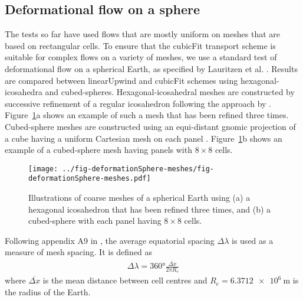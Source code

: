 \subsection{Deformational flow on a sphere}
\label{sec:deformationSphere}
The tests so far have used flows that are mostly uniform on meshes that are based on rectangular cells.
To ensure that the cubicFit transport scheme is suitable for complex flows on a variety of meshes, we use a standard test of deformational flow on a spherical Earth, as specified by Lauritzen et al. \citep{lauritzen2012}.  
Results are compared between linearUpwind and cubicFit schemes using hexagonal-icosahedra and cubed-spheres.
Hexagonal-icosahedral meshes are constructed by successive refinement of a regular icosahedron following the approach by \citep{thuburn2014}.
Figure~\ref{fig:sphere-meshes}a shows an example of such a mesh that has been refined three times.
Cubed-sphere meshes are constructed using an equi-distant gnomic projection of a cube having a uniform Cartesian mesh on each panel \citep{staniforth-thuburn2012}.
Figure~\ref{fig:sphere-meshes}b shows an example of a cubed-sphere mesh having panels with $8 \times 8$ cells.

\begin{figure}
	\centering
	\texttt{[image: ../fig-deformationSphere-meshes/fig-deformationSphere-meshes.pdf]}
	\caption{Illustrations of coarse meshes of a spherical Earth using (a) a hexagonal icosahedron that has been refined three times, and (b) a cubed-sphere with each panel having $8 \times 8$ cells.}
	\label{fig:sphere-meshes}
\end{figure}

Following appendix A9 in \citep{lauritzen2014}, the average equatorial spacing $\Delta \lambda$ is used as a measure of mesh spacing.  It is defined as
\begin{align}
	\Delta \lambda = \ang{360} \frac{\overline{\Delta x}}{2 \pi R_e}
\end{align}
where $\overline{\Delta x}$ is the mean distance between cell centres and $R_e = \SI{6.3712e6}{\meter}$ is the radius of the Earth.

